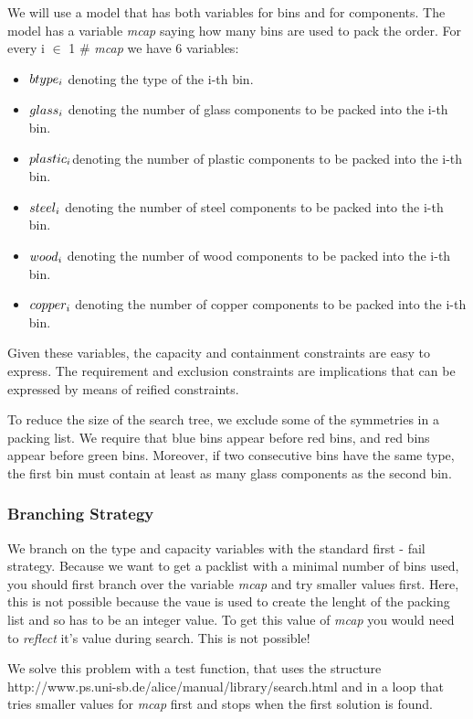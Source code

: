 \documentclass[a4paper,halfparskip]{scrartcl}
\begin{document}
We will use a model that has both variables for bins and for
components. The model has a variable \emph{mcap} saying how many 
bins are used to pack the order. For every i $\in$ 1 $\#$
\emph{mcap} we have 6 variables:
\begin{itemize}
\item
$\emph{btype}_i$ denoting the type of the i-th bin.
\item
$\emph{glass}_i$ denoting the number of glass components to be packed into the i-th bin.
\item
$\emph{plastic}_i $denoting the number of plastic components to be packed into the i-th bin.
\item
$\emph{steel}_i $ denoting the number of steel components to be packed into the i-th bin.
\item
$\emph{wood}_i $ denoting the number of wood components to be packed into the i-th bin.
\item
$\emph{copper}_i $ denoting the number of copper components to be packed into the i-th bin.
\end{itemize}
Given these variables, the capacity and containment constraints 
are easy to express. The requirement and exclusion constraints are 
implications that can be expressed by means of reified constraints.

To reduce the size of the search tree, we exclude some of the symmetries 
in a packing list. We require that blue bins appear before red bins, 
and red bins appear before green bins. Moreover, if two consecutive 
bins have the same type, the first bin must contain at least as many 
glass components as the second bin.

\subsubsection{Branching Strategy}
 
We branch on the type and capacity variables with
the standard first - fail strategy. Because we want to get a 
packlist with a minimal number of bins used, you should first
branch over the variable \emph{mcap} and try smaller values
first. Here, this is not possible because the vaue is used
to create the lenght of the packing list and so has to be an
integer value. To get this value of \emph{mcap} you would need to
\emph{reflect} it's value during search. This is not possible!

We solve this problem with a test function, that uses the structure
\htmladdnormallink{\textcolor{blue}{Search}}
{http://www.ps.uni-sb.de/alice/manual/library/search.html} and
in a loop that tries smaller values for \emph{mcap} first and
stops when the first solution is found.
\end{document}

